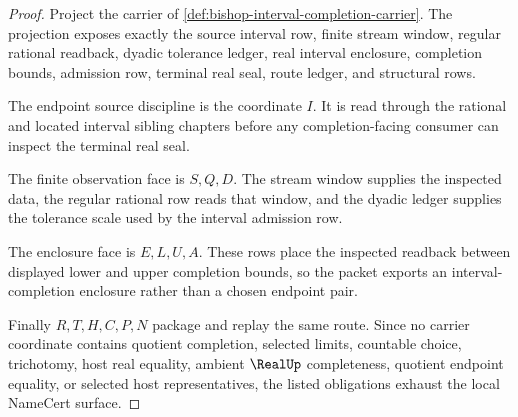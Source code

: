 \begin{proof}
Project the carrier of \autoref{def:bishop-interval-completion-carrier}. The projection exposes exactly the source interval row, finite stream window, regular rational readback, dyadic tolerance ledger, real interval enclosure, completion bounds, admission row, terminal real seal, route ledger, and structural rows.

The endpoint source discipline is the coordinate $I$. It is read through the rational and located interval sibling chapters before any completion-facing consumer can inspect the terminal real seal.

The finite observation face is $S,Q,D$. The stream window supplies the inspected data, the regular rational row reads that window, and the dyadic ledger supplies the tolerance scale used by the interval admission row.

The enclosure face is $E,L,U,A$. These rows place the inspected readback between displayed lower and upper completion bounds, so the packet exports an interval-completion enclosure rather than a chosen endpoint pair.

Finally $R,T,H,C,P,N$ package and replay the same route. Since no carrier coordinate contains quotient completion, selected limits, countable choice, trichotomy, host real equality, ambient $\RealUp$ completeness, quotient endpoint equality, or selected host representatives, the listed obligations exhaust the local NameCert surface.
\end{proof}

